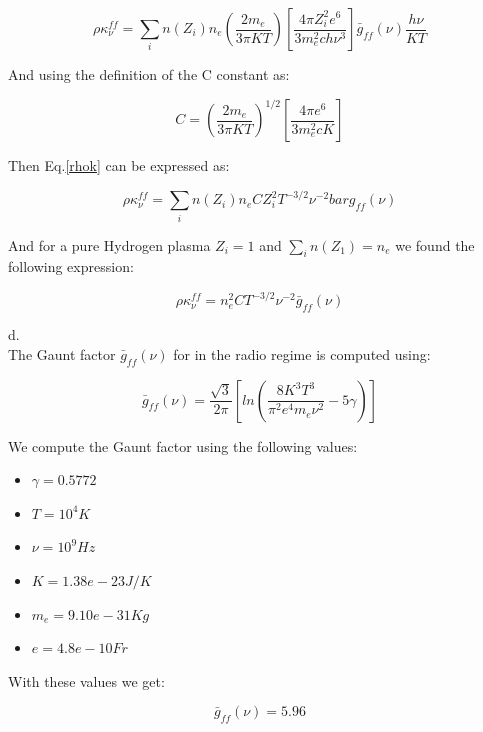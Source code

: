 \documentclass[12pt]{article}
\begin{document}
\begin{equation}\label{rhok}
\rho \kappa_{\nu}^{ff} = \sum_{i} n(Z_i) n_e \left( \dfrac{2m_e}{3\pi K T} \right)
\left[ \dfrac{4 \pi Z_i^2 e^6}{3 m_e^2 c h \nu^3} \right] \bar{g}_{ff}(\nu)\dfrac{h \nu}{KT}
\end{equation}

And using the definition of the C constant as:

\begin{equation}
C = \left( \dfrac{2m_e}{3\pi KT} \right)^{1/2} \left[ \dfrac{4\pi e^6}{3m_e^2 cK} \right]
\end{equation}

Then Eq.\ref{rhok} can be expressed as:

\begin{equation}
\rho \kappa_{\nu}^{ff} = \sum_{i} n(Z_i) n_e C Z_i^2 T^{-3/2} \nu^{-2} bar{g}_{ff}(\nu)
\end{equation}

And for a pure Hydrogen plasma $Z_i = 1$ and $\sum_{i}n(Z_1)=n_e$ we found the 
following expression: 

\begin{equation}
\rho \kappa_{\nu}^{ff} =  n_e^2 C T^{-3/2} \nu^{-2} \bar{g}_{ff}(\nu)
\end{equation}

d.\\

The Gaunt factor $\bar{g}_{ff}(\nu)$ for in the radio regime is computed using:

\begin{equation}
\bar{g}_{ff}(\nu) = \dfrac{\sqrt{3}}{2\pi} \left[
ln\left( \dfrac{8K^3T^3}{\pi^2 e^4 m_{e} \nu^2} 
- 5 \gamma \right) \right]
\end{equation}

We compute the Gaunt factor using the following values:

\begin{itemize}
\item $\gamma = 0.5772$
\item $T=10^4 K$ 
\item $\nu = 10^{9}Hz$
\item $K = 1.38e-23 J/K$
\item $m_e = 9.10e-31 Kg$
\item $e = 4.8e-10 Fr$

\end{itemize}

With these values we get:

\begin{equation}
\bar{g}_{ff}(\nu) = 5.96
\end{equation}
\end{document}
